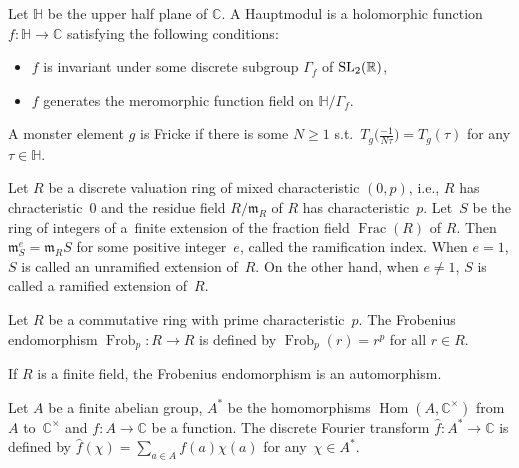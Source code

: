\documentclass[pdftex]{sigma}%
\numberwithin{equation}{section}
\begin{document}
\begin{Definition}
Let $\mathbb{H}$ be the upper half plane of $\mathbb{C}$. A Hauptmodul is a holomorphic function $f\colon \mathbb{H} \rightarrow \mathbb{C}$ satisfying the following conditions:
\begin{itemize}\itemsep=0pt
\item $f$ is invariant under some discrete subgroup $\Gamma_f$ of ${\rm SL}_2(\mathbb{R})$,
\item $f$ generates the meromorphic function field on $\mathbb{H}/\Gamma_f$.
\end{itemize}
\end{Definition}

\begin{Definition}\label{def2.9}
A monster element $g$ is Fricke if there is some $N\geq 1$ s.t.\ $T_g\big(\frac{-1}{N\tau}\big)=T_g(\tau)$ for any $\tau \in \mathbb{H}$.
\end{Definition}

\begin{Definition}
Let $R$ be a discrete valuation ring of mixed characteristic $(0,p)$, i.e., $R$ has chracteristic~0 and the residue field $R/\mathfrak{m}_R$ of $R$ has characteristic~$p$. Let~$S$ be the ring of integers of a~finite extension of the fraction field $\operatorname{Frac}(R)$ of $R$. Then $\mathfrak{m}^e_S=\mathfrak{m}_RS$ for some positive integer~$e$, called the ramification index. When $e=1$, $S$ is called an unramified extension of~$R$. On the other hand, when $e\neq 1$, $S$ is called a ramified extension of~$R$.
\end{Definition}

\begin{Definition}
Let $R$ be a commutative ring with prime characteristic~$p$. The Frobenius endomorphism $\operatorname{Frob}_p\colon R\rightarrow R$ is defined by $\operatorname{Frob}_p(r)=r^p$ for all $r\in R$.
\end{Definition}

If $R$ is a finite field, the Frobenius endomorphism is an automorphism.

\begin{Definition}
Let $A$ be a finite abelian group, $A^*$ be the homomorphisms $\operatorname{Hom}(A,\mathbb{C}^\times)$ from~$A$ to~$\mathbb{C}^\times$ and $f\colon A \rightarrow \mathbb{C}$ be a function. The discrete Fourier transform $\hat{f}\colon A^*\rightarrow \mathbb{C}$ is defined by $\hat{f}(\chi)=\sum_{a \in A}f(a)\chi (a)$ for any~$\chi \in A^*$.
\end{Definition}
\end{document}
